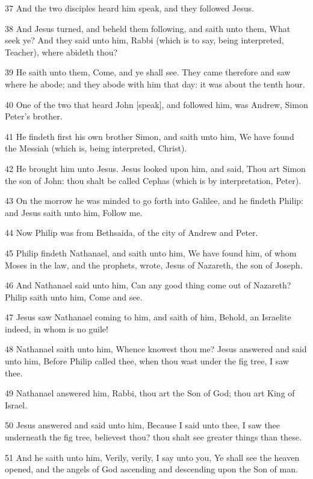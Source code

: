 \par 37 And the two disciples heard him speak, and they followed Jesus.
\par 38 And Jesus turned, and beheld them following, and saith unto them, What seek ye? And they said unto him, Rabbi (which is to say, being interpreted, Teacher), where abideth thou?
\par 39 He saith unto them, Come, and ye shall see. They came therefore and saw where he abode; and they abode with him that day: it was about the tenth hour.
\par 40 One of the two that heard John [speak], and followed him, was Andrew, Simon Peter's brother.
\par 41 He findeth first his own brother Simon, and saith unto him, We have found the Messiah (which is, being interpreted, Christ).
\par 42 He brought him unto Jesus. Jesus looked upon him, and said, Thou art Simon the son of John: thou shalt be called Cephas (which is by interpretation, Peter).
\par 43 On the morrow he was minded to go forth into Galilee, and he findeth Philip: and Jesus saith unto him, Follow me.
\par 44 Now Philip was from Bethsaida, of the city of Andrew and Peter.
\par 45 Philip findeth Nathanael, and saith unto him, We have found him, of whom Moses in the law, and the prophets, wrote, Jesus of Nazareth, the son of Joseph.
\par 46 And Nathanael said unto him, Can any good thing come out of Nazareth? Philip saith unto him, Come and see.
\par 47 Jesus saw Nathanael coming to him, and saith of him, Behold, an Israelite indeed, in whom is no guile!
\par 48 Nathanael saith unto him, Whence knowest thou me? Jesus answered and said unto him, Before Philip called thee, when thou wast under the fig tree, I saw thee.
\par 49 Nathanael answered him, Rabbi, thou art the Son of God; thou art King of Israel.
\par 50 Jesus answered and said unto him, Because I said unto thee, I saw thee underneath the fig tree, believest thou? thou shalt see greater things than these.
\par 51 And he saith unto him, Verily, verily, I say unto you, Ye shall see the heaven opened, and the angels of God ascending and descending upon the Son of man.

